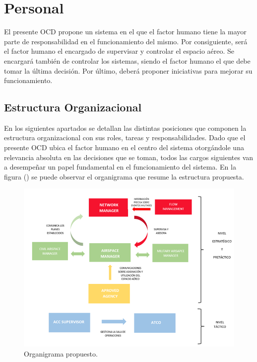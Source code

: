 \section{Personal}

El presente OCD propone un sistema en el que el factor humano tiene la mayor parte de responsabilidad en el funcionamiento del mismo. Por consiguiente, será el factor humano el encargado de supervisar y controlar el espacio aéreo. Se encargará también de controlar los sistemas, siendo el factor humano el que debe tomar la última decisión. Por último, deberá proponer iniciativas para mejorar su funcionamiento.

\subsection{Estructura Organizacional}

En los siguientes apartados se detallan las distintas posiciones que componen la estructura organizacional con sus roles, tareas y responsabilidades. Dado que el presente OCD ubica el factor humano en el centro del sistema otorgándole una relevancia absoluta en las decisiones que se toman, todos las cargos siguientes van a desempeñar un papel fundamental en el funcionamiento del sistema. En la figura () se puede observar el organigrama que resume la estructura propuesta.

\begin{figure}[H]
    \centering
    \includegraphics[width=1\linewidth]{figuras/estructura.png}
    \caption{Organigrama propuesto.}
    \label{fig:estructura}
\end{figure}

